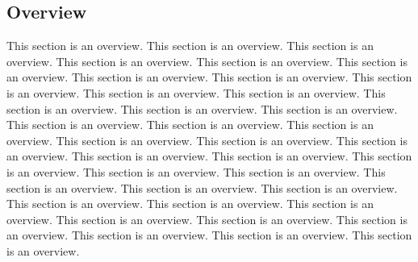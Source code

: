 {
\begin{doublespacing}
\begin{flushleft}


\section{Overview}

This section is an overview. This section is an overview. This section is an overview. This section is an overview. This section is an overview. This section is an overview. This section is an overview. This section is an overview. This section is an overview. This section is an overview. This section is an overview. This section is an overview. This section is an overview. This section is an overview. This section is an overview. This section is an overview. This section is an overview. This section is an overview. This section is an overview. This section is an overview. This section is an overview. This section is an overview. This section is an overview. This section is an overview. This section is an overview. This section is an overview. This section is an overview. This section is an overview. This section is an overview. This section is an overview. This section is an overview. This section is an overview. This section is an overview. This section is an overview. This section is an overview. This section is an overview. This section is an overview. 


\end{flushleft}
\end{doublespacing}
}